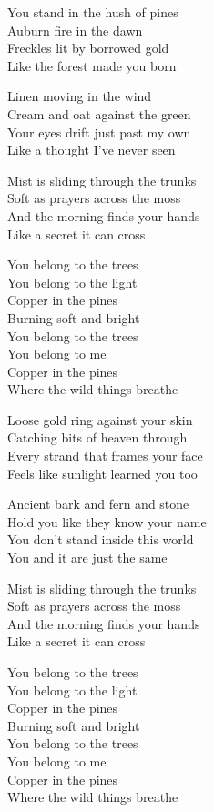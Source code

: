 \begin{lyrics}
You stand in the hush of pines\\
Auburn fire in the dawn\\
Freckles lit by borrowed gold\\
Like the forest made you born

Linen moving in the wind\\
Cream and oat against the green\\
Your eyes drift just past my own\\
Like a thought I’ve never seen

Mist is sliding through the trunks\\
Soft as prayers across the moss\\
And the morning finds your hands\\
Like a secret it can cross

You belong to the trees\\
You belong to the light\\
Copper in the pines\\
Burning soft and bright\\
You belong to the trees\\
You belong to me\\
Copper in the pines\\
Where the wild things breathe

Loose gold ring against your skin\\
Catching bits of heaven through\\
Every strand that frames your face\\
Feels like sunlight learned you too

Ancient bark and fern and stone\\
Hold you like they know your name\\
You don’t stand inside this world\\
You and it are just the same

Mist is sliding through the trunks\\
Soft as prayers across the moss\\
And the morning finds your hands\\
Like a secret it can cross

You belong to the trees\\
You belong to the light\\
Copper in the pines\\
Burning soft and bright\\
You belong to the trees\\
You belong to me\\
Copper in the pines\\
Where the wild things breathe


\end{lyrics}
